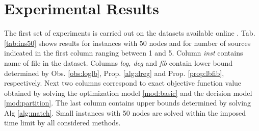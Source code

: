 \section{Experimental Results}

The first set of experiments is carried out on the datasets available online \cite{datasets}.
Tab. \ref{tab:ins50} shows results for instances with 50 nodes and for number of sources indicated in the first column ranging between 1 and 5. 
Column \emph{inst} contains name of file in the dataset.
Columns \emph{log, deg} and \emph{fib} contain lower bound determined by Obs. \ref{obs:loglb}, Prop. \ref{alg:dreg} and Prop. \ref{prop:lbfib}, respectively.
Next two columns correspond to exact objective function value obtained by solving the optimization model \eqref{mod:basic} and the decision model \eqref{mod:partition}.
The last column contains upper bounds determined by solving Alg \ref{alg:match}.
Small instances with 50 nodes are solved within the imposed time limit by all considered methods. 



